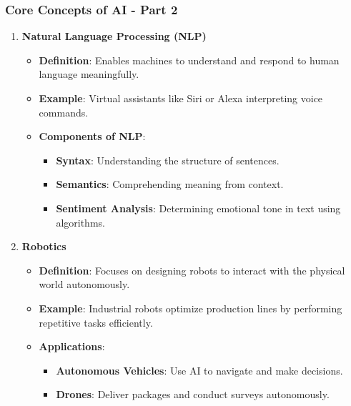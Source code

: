 \documentclass[aspectratio=169]{beamer}
\begin{document}
\begin{frame}[fragile]
    \frametitle{Core Concepts of AI - Part 2}

    \begin{enumerate}[resume]
        \item \textbf{Natural Language Processing (NLP)}
        \begin{itemize}
            \item \textbf{Definition}: Enables machines to understand and respond to human language meaningfully.
            \item \textbf{Example}: Virtual assistants like Siri or Alexa interpreting voice commands.
            \item \textbf{Components of NLP}:
            \begin{itemize}
                \item \textbf{Syntax}: Understanding the structure of sentences.
                \item \textbf{Semantics}: Comprehending meaning from context.
                \item \textbf{Sentiment Analysis}: Determining emotional tone in text using algorithms.
            \end{itemize}
        \end{itemize}

        \item \textbf{Robotics}
        \begin{itemize}
            \item \textbf{Definition}: Focuses on designing robots to interact with the physical world autonomously.
            \item \textbf{Example}: Industrial robots optimize production lines by performing repetitive tasks efficiently.
            \item \textbf{Applications}:
            \begin{itemize}
                \item \textbf{Autonomous Vehicles}: Use AI to navigate and make decisions.
                \item \textbf{Drones}: Deliver packages and conduct surveys autonomously.
            \end{itemize}
        \end{itemize}
    \end{enumerate}
\end{frame}
\end{document}
